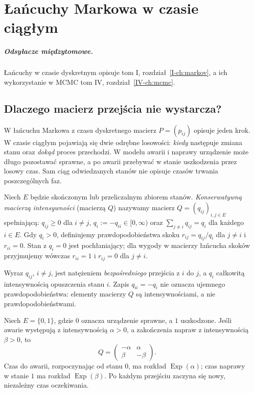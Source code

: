 \chapter{Łańcuchy Markowa w czasie ciągłym}
\label{ch:ctmc}
\paragraph{Odsyłacze międzytomowe.} Łańcuchy w czasie dyskretnym opisuje tom I, rozdział~\ref{I-ch:markov}, a ich wykorzystanie w MCMC tom IV, rozdział~\ref{IV-ch:mcmc}.


\section{Dlaczego macierz przejścia nie wystarcza?}
W łańcuchu Markowa z czasu dyskretnego macierz $P=(p_{ij})$
opisuje jeden krok. W czasie ciągłym pojawiają się dwie odrębne
losowości: \emph{kiedy} następuje zmiana stanu oraz \emph{dokąd}
proces przechodzi. W modelu awarii i naprawy urządzenie może długo
pozostawać sprawne, a po awarii przebywać w stanie uszkodzenia
przez losowy czas. Sam ciąg odwiedzanych stanów nie opisuje
czasów trwania poszczególnych faz.

\begin{definicja}
Niech $E$ będzie skończonym lub przeliczalnym zbiorem stanów.
\emph{Konserwatywną macierzą intensywności} (macierzą $Q$)
nazywamy macierz $Q=(q_{ij})_{i,j\in E}$ spełniającą:
$q_{ij}\ge0$ dla $i\ne j$, $q_i:=-q_{ii}\in[0,\infty)$
oraz $\sum_{j\ne i}q_{ij}=q_i$ dla każdego $i\in E$.
Gdy $q_i>0$, definiujemy prawdopodobieństwa skoku
$r_{ij}=q_{ij}/q_i$ dla $j\ne i$ i $r_{ii}=0$.
Stan z $q_i=0$ jest pochłaniający; dla wygody
w macierzy łańcucha skoków przyjmujemy wówczas
$r_{ii}=1$ i $r_{ij}=0$ dla $j\ne i$.
\end{definicja}

Wyraz $q_{ij}$, $i\ne j$, jest natężeniem \emph{bezpośredniego}
przejścia z $i$ do $j$, a $q_i$ całkowitą intensywnością
opuszczenia stanu $i$. Zapis $q_{ii}=-q_i$ nie oznacza
ujemnego prawdopodobieństwa: elementy macierzy $Q$ są
intensywnościami, a nie prawdopodobieństwami.

\begin{przyklad}
Niech $E=\{0,1\}$, gdzie $0$ oznacza urządzenie sprawne,
a $1$ uszkodzone. Jeśli awarie występują z intensywnością
$\alpha>0$, a zakończenia napraw z intensywnością $\beta>0$,
to
\[
Q=\begin{pmatrix}-\alpha&\alpha\\\beta&-\beta\end{pmatrix}.
\]
Czas do awarii, rozpoczynając od stanu $0$, ma rozkład
$\operatorname{Exp}(\alpha)$; czas naprawy w stanie $1$
ma rozkład $\operatorname{Exp}(\beta)$. Po każdym przejściu
zaczyna się nowy, niezależny czas oczekiwania.
\end{przyklad}

